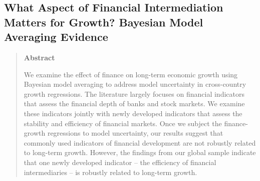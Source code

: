 \begin{refsection}
	\chapter[What Type of Finance Matters for Growth? BMA Evidence]{What Aspect of Financial Intermediation Matters for Growth? Bayesian Model Averaging Evidence}
\label{ch2}

\begin{quote}
\begin{center}\textbf{Abstract}\end{center}
	We examine the effect of finance on long-term economic growth using Bayesian model averaging to address model uncertainty in cross-country growth regressions. The literature largely focuses on financial indicators that assess the financial depth of banks and stock markets. We examine these indicators jointly with newly developed indicators that assess the stability and efficiency of financial markets. Once we subject the finance-growth regressions to model uncertainty, our results suggest that commonly used indicators of financial development are not robustly related to long-term growth. However, the findings from our global sample indicate that one newly developed indicator -- the efficiency of financial intermediaries -- is robustly related to long-term growth.     
	\end{quote}

\clearpage

\end{refsection}
